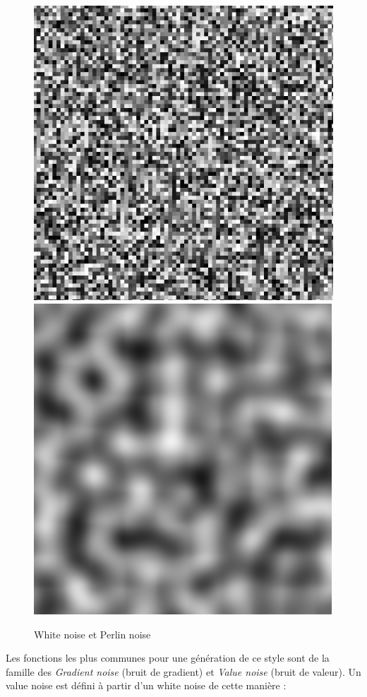 \documentclass{EPUProjetDi}
\begin{document}
\begin{figure}[ht]
	\centering
	\includegraphics[scale=.49]{white_noise}
	\includegraphics[scale=.49]{perlin_noise}
	\caption{White noise et Perlin noise}
	\label{fig:noises}
\end{figure}

Les fonctions les plus communes pour une génération de ce style sont de la famille des \textit{Gradient noise} (bruit de gradient) et \textit{Value noise} (bruit de valeur).
Un value noise est défini à partir d'un white noise de cette manière :
\end{document}
